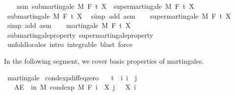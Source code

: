 \begin{isabellebody}
\isanewline
\ \ \isamarkupfalse%
\ asm{\isacharcolon}{\kern0pt}\ {\isachardoublequoteopen}submartingale\ M\ F\ t\ X\ {\isasymand}\ supermartingale\ M\ F\ t\ X{\isachardoublequoteclose}\isanewline
\ \ \isamarkupfalse%
\ submartingale\ M\ F\ t\ X\ \isamarkupfalse%
\ {\isacharparenleft}{\kern0pt}simp\ add{\isacharcolon}{\kern0pt}\ asm{\isacharparenright}{\kern0pt}\isanewline
\ \ \isamarkupfalse%
\ supermartingale\ M\ F\ t\ X\ \isamarkupfalse%
\ {\isacharparenleft}{\kern0pt}simp\ add{\isacharcolon}{\kern0pt}\ asm{\isacharparenright}{\kern0pt}\isanewline
\ \ \isamarkupfalse%
\ {\isachardoublequoteopen}martingale\ M\ F\ t\ X{\isachardoublequoteclose}\ \isamarkupfalse%
\ submartingale{\isacharunderscore}{\kern0pt}property\ supermartingale{\isacharunderscore}{\kern0pt}property\ \isamarkupfalse%
\ {\isacharparenleft}{\kern0pt}unfold{\isacharunderscore}{\kern0pt}locales{\isacharparenright}{\kern0pt}\ {\isacharparenleft}{\kern0pt}intro\ integrable{\isacharcomma}{\kern0pt}\ blast{\isacharcomma}{\kern0pt}\ force{\isacharparenright}{\kern0pt}\isanewline
{}\isamarkupfalse%
%
\endisatagproof
{\isafoldproof}%
%
\isadelimproof
%
\endisadelimproof
%
\isadelimdocument
%
\endisadelimdocument
%
\isatagdocument
%
\isamarkuptrue%
%
\endisatagdocument
{\isafolddocument}%
%
\isadelimdocument
%
\endisadelimdocument
%
\begin{isamarkuptext}%
In the following segment, we cover basic properties of martingales.%
\end{isamarkuptext}\isamarkuptrue%
\isamarkupfalse%
\ martingale\isanewline
{}\isanewline
\isanewline
{}\isamarkupfalse%
\ cond{\isacharunderscore}{\kern0pt}exp{\isacharunderscore}{\kern0pt}diff{\isacharunderscore}{\kern0pt}eq{\isacharunderscore}{\kern0pt}zero{\isacharcolon}{\kern0pt}\isanewline
\ \ \ {\isachardoublequoteopen}t\ {\isasymle}\ i{\isachardoublequoteclose}\ {\isachardoublequoteopen}i\ {\isasymle}\ j{\isachardoublequoteclose}\isanewline
\ \ \ {\isachardoublequoteopen}AE\ {\isasymxi}\ in\ M{\isachardot}{\kern0pt}\ cond{\isacharunderscore}{\kern0pt}exp\ M\ {\isacharparenleft}{\kern0pt}F\ i{\isacharparenright}{\kern0pt}\ {\isacharparenleft}{\kern0pt}{\isasymlambda}{\isasymxi}{\isachardot}{\kern0pt}\ X\ j\ {\isasymxi}\ {\isacharminus}{\kern0pt}\ X\ i\ {\isasymxi}{\isacharparenright}{\kern0pt}\ {\isasymxi}\ {\isacharequal}{\kern0pt}\ {}{\isachardoublequoteclose}\isanewline

\end{isabellebody}
